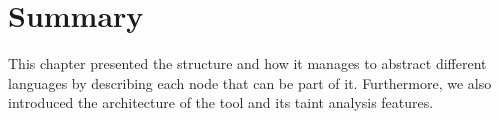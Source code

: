 

\section{Summary}
This chapter presented the \astname{} structure and how it manages to abstract different languages by describing each node that can be part of it. Furthermore, we also introduced the architecture of the \toolname{} tool and its taint analysis features.



